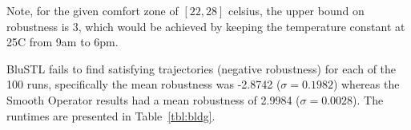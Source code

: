 
Note, for the given comfort zone of $[22,28]$ celsius, the upper bound on robustness is $3$, which would be achieved by keeping the temperature constant at 25C from 9am to 6pm. 

BluSTL fails to find satisfying trajectories (negative robustness) for each of the 100 runs, specifically the mean robustness was -2.8742 ($\sigma = 0.1982$) whereas the Smooth Operator results had a mean robustness of 2.9984 ($\sigma = 0.0028$).
The runtimes are presented in Table~\ref{tbl:bldg}.

